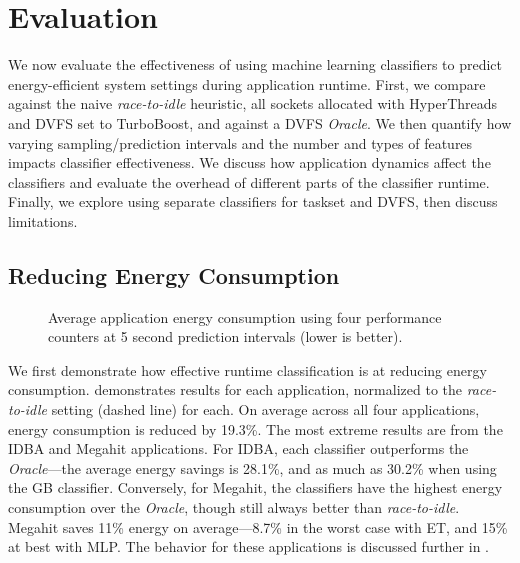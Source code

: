 \section{Evaluation}
\label{sec:classifiers-evaluation}

We now evaluate the effectiveness of using machine learning classifiers to predict energy-efficient system settings during application runtime.
First, we compare against the naive \emph{race-to-idle} heuristic, \ie all sockets allocated with HyperThreads and DVFS set to TurboBoost, and against a DVFS \emph{Oracle}.
We then quantify how varying sampling/prediction intervals and the number and types of features impacts classifier effectiveness.
We discuss how application dynamics affect the classifiers and evaluate the overhead of different parts of the classifier runtime.
Finally, we explore using separate classifiers for taskset and DVFS, then discuss limitations.


\subsection{Reducing Energy Consumption}
\label{sec:eval-first}

\begin{figure}[t]
  \centering
  
  \caption{Average application energy consumption using four performance counters at 5 second prediction intervals (lower is better).}
  \label{fig:compare-apps-pca4}
\end{figure}

We first demonstrate how effective runtime classification is at reducing energy consumption.
 demonstrates results for each application, normalized to the \emph{race-to-idle} setting (dashed line) for each.
On average across all four applications, energy consumption is reduced by 19.3\%.
The most extreme results are from the IDBA and Megahit applications.
For IDBA, each classifier outperforms the \emph{Oracle}---the average energy savings is 28.1\%, and as much as 30.2\% when using the GB classifier.
Conversely, for Megahit, the classifiers have the highest energy consumption over the \emph{Oracle}, though still always better than \emph{race-to-idle}.
Megahit saves 11\% energy on average---8.7\% in the worst case with ET, and 15\% at best with MLP.
The behavior for these applications is discussed further in .

